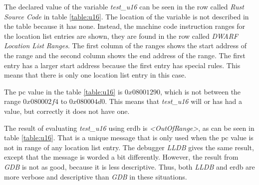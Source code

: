 The declared value of the variable \emph{test\_u16} can be seen in the row called \emph{Rust Source Code} in table \ref{table:u16}.
The location of the variable is not described in the table because it has none.
Instead, the machine code instruction ranges for the location list entries are shown, they are found in the row called \emph{DWARF Location List Ranges}.
The first column of the ranges shows the start address of the range and the second column shows the end address of the range.
The first  entry has a larger start address because the first entry has special rules.
This means that there is only one location list entry in this case.


The \gls{pc} value in the table \ref{table:u16} is $0x08001290$, which is not between the range $0x080002f4$ to $0x080004d0$.
This means that \emph{test\_u16} will or has had a value, but correctly it does not have one.


The result of evaluating \emph{test\_u16} using \gls{erdb} is \emph{\textless OutOfRange\textgreater}, as can be seen in table \ref{table:u16}.
That is a unique message that is only used when the \gls{pc} value is not in range of any location list entry.
The debugger \emph{LLDB} gives the same result, except that the message is worded a bit differently.
However, the result from \emph{GDB} is not as good, because it is less descriptive.
Thus, both \emph{LLDB} and \gls{erdb} are more verbose and descriptive than \emph{GDB} in these situations.
